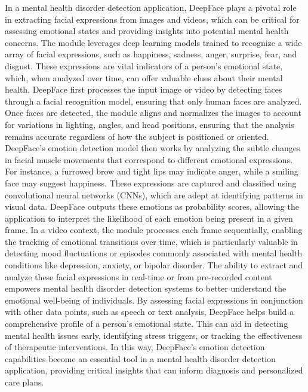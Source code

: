 \noindent
In a mental health disorder detection application, DeepFace plays a pivotal role in extracting facial expressions from images and videos, which can be critical for assessing emotional states and providing insights into potential mental health concerns. The module leverages deep learning models trained to recognize a wide array of facial expressions, such as happiness, sadness, anger, surprise, fear, and disgust. These expressions are vital indicators of a person’s emotional state, which, when analyzed over time, can offer valuable clues about their mental health. DeepFace first processes the input image or video by detecting faces through a facial recognition model, ensuring that only human faces are analyzed. Once faces are detected, the module aligns and normalizes the images to account for variations in lighting, angles, and head positions, ensuring that the analysis remains accurate regardless of how the subject is positioned or oriented. DeepFace's emotion detection model then works by analyzing the subtle changes in facial muscle movements that correspond to different emotional expressions. For instance, a furrowed brow and tight lips may indicate anger, while a smiling face may suggest happiness. These expressions are captured and classified using convolutional neural networks (CNNs), which are adept at identifying patterns in visual data. DeepFace outputs these emotions as probability scores, allowing the application to interpret the likelihood of each emotion being present in a given frame. In a video context, the module processes each frame sequentially, enabling the tracking of emotional transitions over time, which is particularly valuable in detecting mood fluctuations or episodes commonly associated with mental health conditions like depression, anxiety, or bipolar disorder. The ability to extract and analyze these facial expressions in real-time or from pre-recorded content empowers mental health disorder detection systems to better understand the emotional well-being of individuals. By assessing facial expressions in conjunction with other data points, such as speech or text analysis, DeepFace helps build a comprehensive profile of a person’s emotional state. This can aid in detecting mental health issues early, identifying stress triggers, or tracking the effectiveness of therapeutic interventions. In this way, DeepFace’s emotion detection capabilities become an essential tool in a mental health disorder detection application, providing critical insights that can inform diagnosis and personalized care plans.



